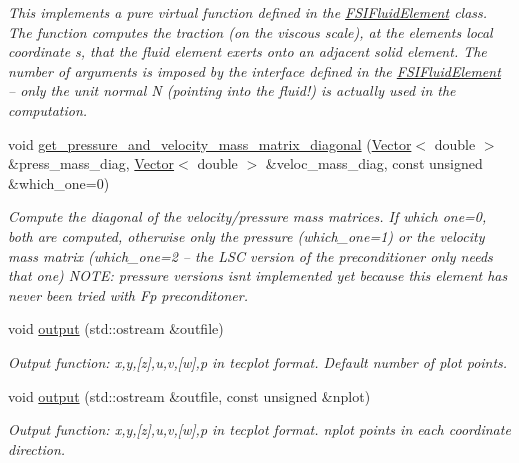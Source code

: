 \begin{DoxyCompactItemize}
\begin{DoxyCompactList}\small\item\em This implements a pure virtual function defined in the \hyperlink{classoomph_1_1FSIFluidElement}{F\+S\+I\+Fluid\+Element} class. The function computes the traction (on the viscous scale), at the element\textquotesingle{}s local coordinate s, that the fluid element exerts onto an adjacent solid element. The number of arguments is imposed by the interface defined in the \hyperlink{classoomph_1_1FSIFluidElement}{F\+S\+I\+Fluid\+Element} -- only the unit normal N (pointing into the fluid!) is actually used in the computation. \end{DoxyCompactList}\item 
void \hyperlink{classoomph_1_1SphericalNavierStokesEquations_a3cb7aec8278bb92aa731a19777608cac}{get\+\_\+pressure\+\_\+and\+\_\+velocity\+\_\+mass\+\_\+matrix\+\_\+diagonal} (\hyperlink{classoomph_1_1Vector}{Vector}$<$ double $>$ \&press\+\_\+mass\+\_\+diag, \hyperlink{classoomph_1_1Vector}{Vector}$<$ double $>$ \&veloc\+\_\+mass\+\_\+diag, const unsigned \&which\+\_\+one=0)
\begin{DoxyCompactList}\small\item\em Compute the diagonal of the velocity/pressure mass matrices. If which one=0, both are computed, otherwise only the pressure (which\+\_\+one=1) or the velocity mass matrix (which\+\_\+one=2 -- the L\+SC version of the preconditioner only needs that one) N\+O\+TE\+: pressure versions isn\textquotesingle{}t implemented yet because this element has never been tried with Fp preconditoner. \end{DoxyCompactList}\item 
void \hyperlink{classoomph_1_1SphericalNavierStokesEquations_a1d08588d3d9462de04d447506af5cdd5}{output} (std\+::ostream \&outfile)
\begin{DoxyCompactList}\small\item\em Output function\+: x,y,\mbox{[}z\mbox{]},u,v,\mbox{[}w\mbox{]},p in tecplot format. Default number of plot points. \end{DoxyCompactList}\item 
void \hyperlink{classoomph_1_1SphericalNavierStokesEquations_a5506adeb5ecb11e16254b5ee48049c5d}{output} (std\+::ostream \&outfile, const unsigned \&nplot)
\begin{DoxyCompactList}\small\item\em Output function\+: x,y,\mbox{[}z\mbox{]},u,v,\mbox{[}w\mbox{]},p in tecplot format. nplot points in each coordinate direction. \end{DoxyCompactList}\item 

\end{DoxyCompactItemize}
